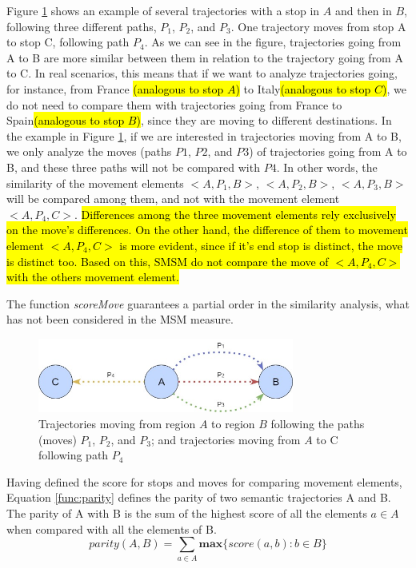 \documentclass[12pt]{article}
\begin{document}
Figure \ref{fig:move} shows an example of several trajectories with a stop in $A$ and then in $B$, following three different paths, $P_1$, $P_2$, and $P_3$. One trajectory moves from stop A to stop C, following path $P_4$. As we can see in the figure, trajectories going from A to B are more similar between them in relation to the trajectory going from A to C.
In real scenarios, this means that if we want to analyze trajectories going, for instance, from France \hl{(analogous to stop $A$)} to Italy\hl{(analogous to stop $C$)}, we do not need to compare them with trajectories going from France to Spain\hl{(analogous to stop $B$)}, since they are moving to different destinations. In the example in Figure \ref{fig:move}, if we are interested in trajectories moving from A to B, we only analyze the moves (paths $P1$, $P2$, and $P3$) of trajectories going from A to B, and these three paths will not be compared with $P4$. In other words, the similarity of the movement elements $<A, P_1, B>$, $<A, P_2, B>$, $<A, P_3, B>$ will be compared among them, and not with the movement element $<A, P_4, C>$. \hl{Differences among the three movement elements rely exclusively on the move's differences. On the other hand, the difference of them to movement element $<A, P_4, C>$ is more evident, since if it's end stop is distinct, the move is distinct too. Based on this, SMSM do not compare the move of $<A, P_4, C>$ with the others movement element.}

The function \emph{scoreMove} guarantees a partial order in the similarity analysis, what has not been considered in the MSM measure.

\begin{figure}[h]
\centering
\includegraphics[width=0.75\textwidth]{Images/Toy_trajectories.jpg}
\caption{\label{fig:move} Trajectories moving from region $A$ to region $B$ following the paths (moves) $P_1$, $P_2$, and $P_3$; and trajectories moving from $A$ to C following path $P_4$}
\end{figure}

Having defined the score for stops and moves for comparing movement elements, Equation \ref{func:parity} defines the parity of two semantic trajectories A and B. The parity of A with B is the sum of the highest score of all the elements $a \in A$ when compared with all the elements of B.
\begin{equation}
\label{func:parity}
parity(A, B) = \sum\limits_{a\in A} \textbf{max}\{\textit{score}(a, b) : b \in B\}
\end{equation}
\end{document}
